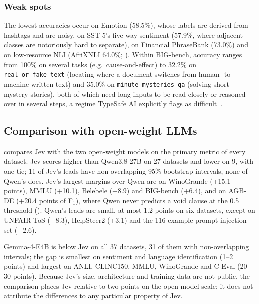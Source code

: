 \documentclass[table]{article}
\begin{document}
\subsubsection{Weak spots}
The lowest accuracies occur on Emotion (58.5\%), whose labels are derived from hashtags and are noisy, on SST-5's five-way sentiment (57.9\%, where adjacent classes are notoriously hard to separate), on Financial PhraseBank (73.0\%) and on low-resource NLI (AfriXNLI 64.0\%; ). Within BIG-bench, accuracy ranges from 100\% on several tasks (e.g.\ cause-and-effect) to 32.2\% on \texttt{real\_or\_fake\_text} (locating where a document switches from human- to machine-written text) and 35.0\% on \texttt{minute\_mysteries\_qa} (solving short mystery stories), both of which need long inputs to be read closely or reasoned over in several steps, a regime TypeSafe AI explicitly flags as difficult~\cite{typesafe2026jev}.

\subsection{Comparison with open-weight LLMs}
\label{sec:comparison}

\begin{table}[p]
\centering
\caption{Jev and the two open-weight reference models on identical requests: primary metric (best per dataset in bold) and ECE of the first Choice or Noul question (-- for Score-only tasks).}
\label{tab:comparison}
\footnotesize
\setlength{\tabcolsep}{3pt}

\end{table}

 compares Jev with the two open-weight models on the primary metric of every dataset. Jev scores higher than Qwen3.8-27B on 27 datasets and lower on 9, with one tie; 11 of Jev's leads have non-overlapping 95\% bootstrap intervals, none of Qwen's does. Jev's largest margins over Qwen are on WinoGrande (+15.1 points), MMLU (+10.1), Belebele (+8.9) and BIG-bench (+6.4), and on AGB-DE (+20.4 points of F$_\text{1}$), where Qwen never predicts a void clause at the 0.5 threshold (). Qwen's leads are small, at most 1.2 points on six datasets, except on UNFAIR-ToS (+8.3), HelpSteer2 (+3.1) and the 116-example prompt-injection set (+2.6). 

Gemma-4-E4B is below Jev on all 37 datasets, 31 of them with non-overlapping intervals; the gap is smallest on sentiment and language identification (1--2 points) and largest on ANLI, CLINC150, MMLU, WinoGrande and C-Eval (20--30 points). Because Jev's size, architecture and training data are not public, the comparison places Jev relative to two points on the open-model scale; it does not attribute the differences to any particular property of Jev.
\end{document}
